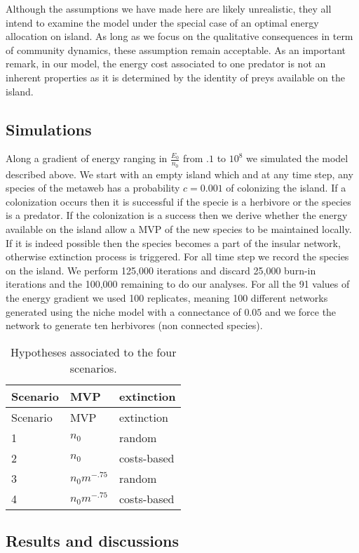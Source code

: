 Although the assumptions we have made here are likely unrealistic, they
all intend to examine the model under the special case of an optimal
energy allocation on island. As long as we focus on the qualitative
consequences in term of community dynamics, these assumption remain
acceptable. As an important remark, in our model, the energy cost
associated to one predator is not an inherent properties as it is
determined by the identity of preys available on the island.

\subsection{Simulations}\label{simulations}

Along a gradient of energy ranging in \(\frac{E_0}{n_0}\) from \(.1\) to
\(10^8\) we simulated the model described above. We start with an empty
island which and at any time step, any species of the metaweb has a
probability \(c=0.001\) of colonizing the island. If a colonization
occurs then it is successful if the specie is a herbivore or the species
is a predator. If the colonization is a success then we derive whether
the energy available on the island allow a MVP of the new species to be
maintained locally. If it is indeed possible then the species becomes a
part of the insular network, otherwise extinction process is triggered.
For all time step we record the species on the island. We perform
125,000 iterations and discard 25,000 burn-in iterations and the 100,000
remaining to do our analyses. For all the 91 values of the energy
gradient we used 100 replicates, meaning 100 different networks
generated using the niche model with a connectance of \(0.05\) and we
force the network to generate ten herbivores (non connected species).

\begin{longtable}[]{@{}lll@{}}
\caption{Hypotheses associated to the four scenarios.}\tabularnewline
\toprule
Scenario & MVP & extinction\tabularnewline
\midrule
\endfirsthead
\toprule
Scenario & MVP & extinction\tabularnewline
\midrule
\endhead
1 & \(n_0\) & random\tabularnewline
2 & \(n_0\) & costs-based\tabularnewline
3 & \(n_0m^{-.75}\) & random\tabularnewline
4 & \(n_0m^{-.75}\) & costs-based\tabularnewline
\bottomrule
\end{longtable}

\subsection{Results and discussions}\label{results-and-discussions}

